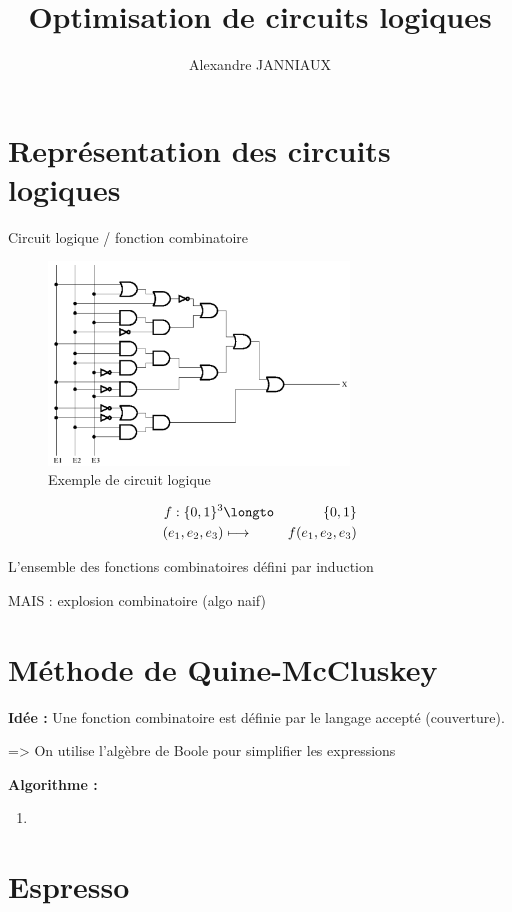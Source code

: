 \documentclass[12pt]{article}
\title{Optimisation de circuits logiques}
\author{Alexandre JANNIAUX}
\newcommand{\creerPage}[1]{
    \newpage
    \section{#1}
}
\begin{document}
    \maketitle
    \tableofcontents

    \newpage

    \creerPage{Représentation des circuits logiques}
        
        Circuit logique  / fonction combinatoire
            \begin{figure}[p]
                \includegraphics[width=8cm]{images/circuit_logique.png}
                \caption{Exemple de circuit logique}
                \label{fig:circ1}
            \end{figure}

        \[ \begin{aligned}
            f: \{0,1\}^3 &\longto &\{0,1\} \\
                (e_1,e_2,e_3) & \longmapsto & f(e_1,e_2,e_3) 
            \end{aligned}
        \]

        L'ensemble des fonctions combinatoires défini par induction

        MAIS : explosion combinatoire (algo naif)

    \creerPage{Méthode de Quine-McCluskey}

        \large{\textbf{Idée :}} Une fonction combinatoire est définie par le langage accepté (couverture).

        => On utilise l'algèbre de Boole pour simplifier les expressions

        \large{\textbf{Algorithme :}}
            \begin{enumerate}
                \item 
            \end{enumerate}
    \creerPage{Espresso}
\end{document}
